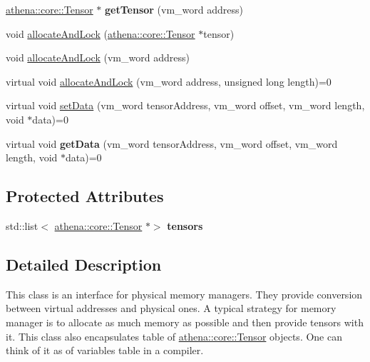 \begin{DoxyCompactItemize}
\mbox{\label{classathena_1_1backend_1_1_abstract_memory_manager_abd79e10b1e4d51ed592075138e0076f2}} 
\mbox{\hyperlink{classathena_1_1core_1_1_tensor}{athena\+::core\+::\+Tensor}} $\ast$ {\bfseries get\+Tensor} (vm\+\_\+word address)
\item 
void \mbox{\hyperlink{classathena_1_1backend_1_1_abstract_memory_manager_ad40a653a8b32410956ba835ca1bb3e5f}{allocate\+And\+Lock}} (\mbox{\hyperlink{classathena_1_1core_1_1_tensor}{athena\+::core\+::\+Tensor}} $\ast$tensor)
\item 
void \mbox{\hyperlink{classathena_1_1backend_1_1_abstract_memory_manager_ab5305b3d1ab91960bf179ce0be166120}{allocate\+And\+Lock}} (vm\+\_\+word address)
\item 
virtual void \mbox{\hyperlink{classathena_1_1backend_1_1_abstract_memory_manager_a1b80008e94c21d5ac87f9a45d3f212a8}{allocate\+And\+Lock}} (vm\+\_\+word address, unsigned long length)=0
\item 
virtual void \mbox{\hyperlink{classathena_1_1backend_1_1_abstract_memory_manager_a18562c6f336ff0f7ff800f877696c851}{set\+Data}} (vm\+\_\+word tensor\+Address, vm\+\_\+word offset, vm\+\_\+word length, void $\ast$data)=0
\item 
\mbox{\label{classathena_1_1backend_1_1_abstract_memory_manager_afb390b564e93215521c7ef7f7a7dd266}} 
virtual void {\bfseries get\+Data} (vm\+\_\+word tensor\+Address, vm\+\_\+word offset, vm\+\_\+word length, void $\ast$data)=0
\end{DoxyCompactItemize}
\subsection*{Protected Attributes}
\begin{DoxyCompactItemize}
\item 
\mbox{\label{classathena_1_1backend_1_1_abstract_memory_manager_a95e7f8064dea9c79d8e88d39affafda7}} 
std\+::list$<$ \mbox{\hyperlink{classathena_1_1core_1_1_tensor}{athena\+::core\+::\+Tensor}} $\ast$$>$ {\bfseries tensors}
\end{DoxyCompactItemize}


\subsection{Detailed Description}
This class is an interface for physical memory managers. They provide conversion between virtual addresses and physical ones. A typical strategy for memory manager is to allocate as much memory as possible and then provide tensors with it. This class also encapsulates table of \mbox{\hyperlink{classathena_1_1core_1_1_tensor}{athena\+::core\+::\+Tensor}} objects. One can think of it as of variables table in a compiler. 

